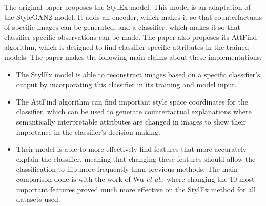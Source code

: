 The original paper proposes the StylEx model. This model is an adaptation of the StyleGAN2 model. It adds an encoder, which makes it so that counterfactuals of specific images can be generated, and a classifier, which makes it so that classifier specific observations can be made. The paper also proposes its AttFind algorithm, which is designed to find classifier-specific attributes in the trained models. The paper makes the following main claims about these implementations:
\begin{itemize}
    \item The StylEx model is able to reconstruct images based on a specific classifier's output by incorporating this classifier in its training and model input.

    \item The AttFind algorithm can find important style space coordinates for the classifier, which can be used to generate counterfactual explanations where semantically interpretable attributes are changed in images to show their importance in the classifier's decision making.

    \item Their model is able to more effectively find features that more accurately explain the classifier, meaning that changing these features should allow the classification to flip more frequently than previous methods. The main comparison done is with the work of Wu \textit{et al.}\cite{Wu_2021_CVPR}, where changing the 10 most important features proved much more effective on the StylEx method for all datasets used.



\end{itemize}

